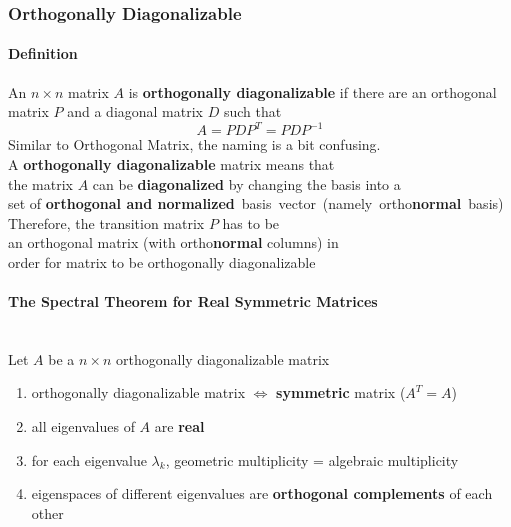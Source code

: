 \documentclass[11pt]{article}
\newcommand{\mymat}[1]{#1}
\begin{document}
    \newpage
    \subsubsection{Orthogonally Diagonalizable} \label{sec3_5_6}
    \paragraph{Definition} An $n \times n$ matrix $\mymat{A}$ is \textbf{orthogonally diagonalizable} if there are an orthogonal matrix $\mymat{P}$ and a diagonal matrix $\mymat{D}$ such that
    \begin{equation}
        \mymat{A} = \mymat{P}\mymat{D}\mymat{P}^{T} = \mymat{P}\mymat{D}\mymat{P}^{-1}
    \end{equation}
    Similar to Orthogonal Matrix, the naming is a bit confusing. \\
    A \textbf{orthogonally diagonalizable} matrix means that \\
    \quad the matrix $\mymat{A}$ can be \textbf{diagonalized} by changing the basis into a \\
    \quad set of \textbf{orthogonal and normalized}~basis~vector~(namely~ortho\textbf{normal}~basis)
    Therefore, the transition matrix $\mymat{P}$ has to be \\
    \quad an orthogonal matrix (with ortho\textbf{normal} columns) in \\
    \quad order for matrix to be orthogonally diagonalizable

    \paragraph{The Spectral Theorem for Real Symmetric Matrices}~\\
    \quad Let $\mymat{A}$ be a $n \times n$ orthogonally diagonalizable matrix
    \begin{enumerate}
        \item orthogonally diagonalizable matrix $\iff$ \textbf{symmetric} matrix ($\mymat{A}^T = \mymat{A}$)
        \item all eigenvalues of $\mymat{A}$ are \textbf{real}
        \item for each eigenvalue $\lambda_k$, geometric multiplicity = algebraic multiplicity
        \item eigenspaces of different eigenvalues are \textbf{orthogonal complements} of each other
    \end{enumerate}
\end{document}
